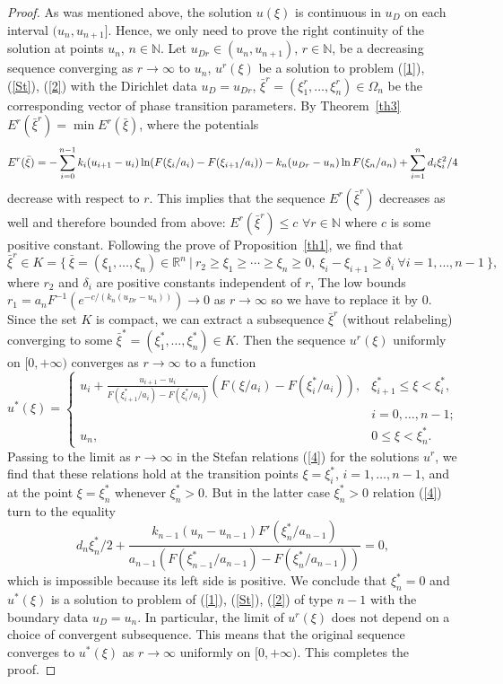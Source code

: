 \documentclass[10pt,a4paper]{amsart}
\numberwithin{equation}{section}
\newcommand{\R}{{\mathbb R}}
\newcommand{\N}{{\mathbb N}}
\begin{document}
\begin{proof}
As was mentioned above, the solution $u(\xi)$ is continuous in $u_D$ on each interval $(u_n,u_{n+1}]$. Hence, we only need to prove the right continuity of the solution at points $u_n$, $n\in\N$. Let $u_{Dr}\in (u_n,u_{n+1})$, $r\in\N$, be a decreasing sequence converging as $r\to\infty$ to $u_n$, $u^r(\xi)$ be a solution to problem (\ref{1}), (\ref{St}), (\ref{2}) with the Dirichlet data $u_D=u_{Dr}$, $\bar\xi^r=(\xi^r_1,\ldots,\xi^r_n)\in\Omega_n$ be the corresponding vector of phase transition parameters. By Theorem~\ref{th3} $E^r(\bar\xi^r)=\min E^r(\bar\xi)$, where the potentials
\[E^r(\bar\xi)=-\sum_{i=0}^{n-1} k_i(u_{i+1}-u_i)\ln (F(\xi_i/a_i)-F(\xi_{i+1}/a_i))-\nonumber\\  k_n(u_{Dr}-u_n)\ln F(\xi_n/a_n)+\sum_{i=1}^n d_i\xi_i^2/4\] decrease with respect to $r$. This implies that the sequence $E^r(\bar\xi^r)$ decreases as well and therefore bounded from above: $E^r(\bar\xi^r)\le c$ $\forall r\in\N$ where $c$ is some positive constant. Following the prove of Proposition~\ref{th1}, we find that
\[\bar\xi^r\in K=\{ \ \bar\xi=(\xi_1,\ldots,\xi_n)\in\R^n \ | \ r_2\ge\xi_1\ge\cdots\ge\xi_n\ge 0, \ \xi_i-\xi_{i+1}\ge\delta_i \ \forall i=1,\ldots,n-1 \ \},
\]
where $r_2$ and $\delta_i$ are positive constants independent of $r$, The low bounds $r_1=a_nF^{-1}(e^{-c/(k_n(u_{Dr}-u_n))})\to 0$ as $r\to\infty$ so we have to replace it by $0$. Since the set $K$ is compact, we can extract a subsequence $\bar\xi^r$ (without relabeling) converging to some $\bar\xi^*=(\xi^*_1,\ldots,\xi^*_n)\in K$.
Then the sequence $u^r(\xi)$ uniformly on $[0,+\infty)$ converges as $r\to\infty$ to a function
\[
u^*(\xi)=\left\{\begin{array}{lr} u_i+\frac{u_{i+1}-u_i}{F(\xi^*_{i+1}/a_i)-F(\xi^*_i/a_i)}(F(\xi/a_i)-F(\xi^*_i/a_i)), &
\xi^*_{i+1}\le\xi<\xi^*_i, \\ & i=0,\ldots,n-1; \\
u_n, & 0\le\xi<\xi^*_n.
\end{array}\right.
\]
Passing to the limit as $r\to\infty$ in the Stefan relations (\ref{4}) for the solutions $u^r$, we find that these relations hold at the transition points $\xi=\xi^*_i$, $i=1,\ldots,n-1$, and at the point $\xi=\xi^*_n$ whenever
$\xi^*_n>0$. But in the latter case $\xi^*_n>0$ relation (\ref{4}) turn to the equality
\[
d_n\xi^*_n/2+
\frac{k_{n-1}(u_n-u_{n-1})F'(\xi^*_n/a_{n-1})}{a_{n-1}(F(\xi^*_{n-1}/a_{n-1})-F(\xi^*_n/a_{n-1}))}=0,
\]
which is impossible because its left side is positive. We conclude that $\xi^*_n=0$ and $u^*(\xi)$ is a solution
to problem of (\ref{1}), (\ref{St}), (\ref{2}) of type $n-1$ with the boundary data $u_D=u_n$. In particular, the limit of
$u^r(\xi)$ does not depend on a choice of convergent subsequence. This means that the original sequence converges to $u^*(\xi)$ as $r\to\infty$ uniformly on $[0,+\infty)$. This completes the proof.
\end{proof}
\end{document}
